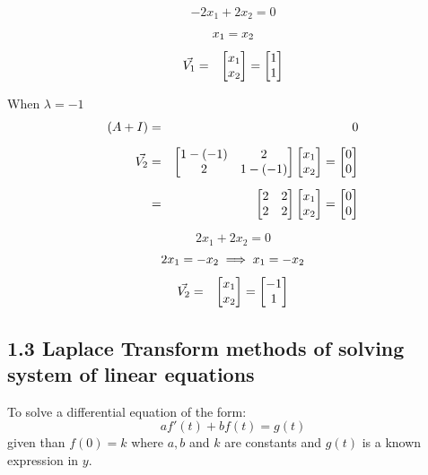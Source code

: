 \documentclass[12pt]{report}
\newcommand{\sps}{\\[0.2cm]}
\newcommand{\NI}{\noindent}
\newcommand{\sprime}{'}
\begin{document}
	$$-2x_1 + 2x_2 = 0$$
	$$x_1 = x_2\sps$$
	\begin{eqnarray}
		\vec{V_1} &=& \begin{bmatrix}
			x_1\\
			x_2
		\end{bmatrix}
		=
		\begin{bmatrix}
			1\\
			1
		\end{bmatrix}\notag
	\end{eqnarray}
	
	\NI When $\lambda = -1$
	\begin{eqnarray}
		(A + I) &=& 0\notag\sps
		\vec{V_2} &=&  \begin{bmatrix}
			1-(-1) & 2\\
			2 & 1 - (-1)
		\end{bmatrix}
		\begin{bmatrix}
			x_1 \\
			x_2
		\end{bmatrix}
		=
		\begin{bmatrix}
			0\\
			0
		\end{bmatrix}\notag\sps
		&=& \begin{bmatrix}
			2 & 2\\
			2 & 2
		\end{bmatrix}
		\begin{bmatrix}
			x_1 \\
			x_2
		\end{bmatrix}
		=
		\begin{bmatrix}
			0\\
			0
		\end{bmatrix}\notag
	\end{eqnarray}
	
	$$2x_1 + 2x_2 = 0$$
	$$2x_1 = -x_2 \implies x_1 = -x_2\sps$$
	\begin{eqnarray}
		\vec{V_2} &=& \begin{bmatrix}
			x_1\\
			x_2
		\end{bmatrix}
		=
		\begin{bmatrix}
			-1\\
			1
		\end{bmatrix}\notag
	\end{eqnarray}
	
	\subsection*{1.3 Laplace Transform methods of solving system of linear equations}
	To solve a differential equation of the form:
	\begin{equation*}
		af\sprime(t) + bf(t) = g(t)
	\end{equation*}
	given than $f(0)=k$ where $a,b$ and $k$ are constants and $g(t)$ is a known expression in $y$.
	
\end{document}

